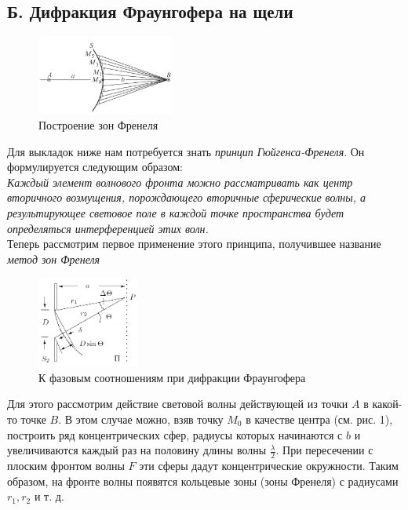 \subsection*{Б. Дифракция Фраунгофера на щели}
\begin{figure}
  \begin{center}
    \includegraphics[width = 0.4\textwidth]{2.png}
  \end{center}
  \caption{Построение зон Френеля}
\end{figure}
Для выкладок ниже нам потребуется знать \textit{принцип Гюйгенса-Френеля}. Он формулируется следующим образом:\\
\textit{Каждый элемент волнового фронта можно рассматривать как центр  вторичного возмущения, порождающего вторичные сферические волны, а результирующее световое поле  в каждой точке пространства будет определяться интерференцией этих волн.}\\
Теперь рассмотрим первое применение этого принципа, получившее название \textit{метод зон Френеля}

\begin{figure}
  \begin{center}
    \includegraphics[width = 0.3\textwidth]{1.png}
  \end{center}
  \caption{К фазовым соотношениям при дифракции Фраунгофера}
  \vspace{+30pt}
\end{figure}

Для этого рассмотрим действие световой волны действующей из точки $A$ в какой-то точке $B$.
В этом случае можно, взяв точку $M_0$ в качестве центра (см. рис. 1), построить ряд концентрических сфер, радиусы которых начинаются с $b$ и увеличиваются каждый раз на половину длины волны $\frac{\lambda}{2}$. При пересечении с плоским фронтом волны $F$ эти сферы дадут концентрические окружности. Таким образом, на фронте волны появятся кольцевые зоны (зоны Френеля) с радиусами $r_1, r_2$ и т. д.

